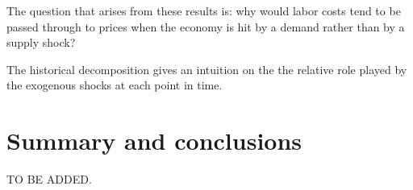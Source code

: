\documentclass[11pt]{article}
\begin{document}
The question that arises from these results is: why would labor costs tend to be passed through to prices when the economy is hit by a demand rather than by a supply shock? 








The historical decomposition gives an intuition on the  the relative role played by the exogenous shocks at each point in time.

\section{Summary and conclusions}
\label{Section:Conclusion}
TO BE ADDED.
\end{document}
